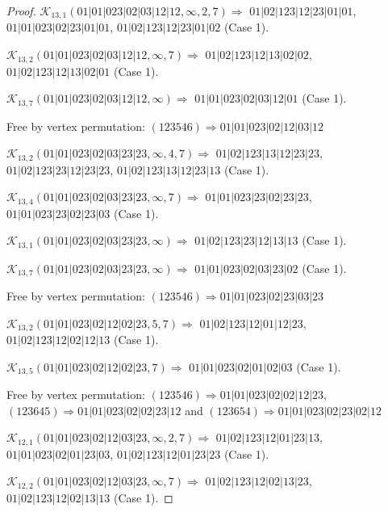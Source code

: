 \documentclass[12pt]{article}
\theoremstyle{plain}
\theoremstyle{definition}
\theoremstyle{remark}
\newcommand{\fancy}[1]{\mathcal{#1}}
\def\K{\fancy{K}}
\begin{document}
\begin{proof}
	
	
	\bigskip
	
	$\K_{13,1}(01|01|023|02|03|12|12,\infty,2, 7)\Rightarrow $ $01|02|123|12|23|01|01$, $01|01|023|02|23|01|01$, $01|02|123|12|23|01|02$ (Case 1).
	
	$\K_{13,2}(01|01|023|02|03|12|12,\infty,7)\Rightarrow $ $01|02|123|12|13|02|02$, $01|02|123|12|13|02|01$ (Case 1).
	
	$\K_{13,7}(01|01|023|02|03|12|12,\infty)\Rightarrow $ $01|01|023|02|03|12|01$ (Case 1).
	
	
	
	Free by vertex permutation: $(1 2 3 5 4 6)\Rightarrow 01|01|023|02|12|03|12$
	
	
	
	\bigskip
	
	$\K_{13,2}(01|01|023|02|03|23|23,\infty,4, 7)\Rightarrow $ $01|02|123|13|12|23|23$, $01|02|123|23|12|23|23$, $01|02|123|13|12|23|13$ (Case 1).
	
	$\K_{13,4}(01|01|023|02|03|23|23,\infty,7)\Rightarrow $ $01|01|023|23|02|23|23$, $01|01|023|23|02|23|03$ (Case 1).
	
	$\K_{13,1}(01|01|023|02|03|23|23,\infty)\Rightarrow $ $01|02|123|23|12|13|13$ (Case 1).
	
	$\K_{13,7}(01|01|023|02|03|23|23,\infty)\Rightarrow $ $01|01|023|02|03|23|02$ (Case 1).
	
	
	
	Free by vertex permutation: $(1 2 3 5 4 6)\Rightarrow 01|01|023|02|23|03|23$
	
	
	
	\bigskip
	
	$\K_{13,2}(01|01|023|02|12|02|23,5, 7)\Rightarrow $ $01|02|123|12|01|12|23$, $01|02|123|12|02|12|13$ (Case 1).
	
	$\K_{13,5}(01|01|023|02|12|02|23,7)\Rightarrow $ $01|01|023|02|01|02|03$ (Case 1).
	
	
	
	Free by vertex permutation: $(1 2 3 5 4 6)\Rightarrow 01|01|023|02|02|12|23$, $(1 2 3 6 4 5)\Rightarrow 01|01|023|02|02|23|12$ and $(1 2 3 6 5 4)\Rightarrow 01|01|023|02|23|02|12$
	
	
	
	\bigskip
	
	$\K_{12,1}(01|01|023|02|12|03|23,\infty,2, 7)\Rightarrow $ $01|02|123|12|01|23|13$, $01|01|023|02|01|23|03$, $01|02|123|12|01|23|23$ (Case 1).
	
	$\K_{12,2}(01|01|023|02|12|03|23,\infty,7)\Rightarrow $ $01|02|123|12|02|13|23$, $01|02|123|12|02|13|13$ (Case 1).
	

\end{proof}
\end{document}
